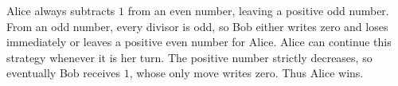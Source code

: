 Alice always subtracts $1$ from an even number, leaving a positive odd number. From an odd number, every divisor is odd, so Bob either writes zero and loses immediately or leaves a positive even number for Alice. Alice can continue this strategy whenever it is her turn. The positive number strictly decreases, so eventually Bob receives $1$, whose only move writes zero. Thus Alice wins.
